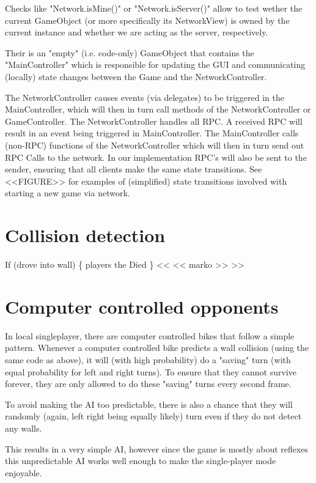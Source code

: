\documentclass{report}
\begin{document}
Checks like "Network.isMine()" or "Network.isServer()" allow to test wether the current GameObject (or more specifically its NetworkView) is owned by the current instance and whether we are acting as the server, respectively. 

Their is an "empty" (i.e. code-only) GameObject that contains the "MainController" which is responsible for updating the GUI and communicating (locally) state changes between the Game and the NetworkController.

The NetworkController causes events (via delegates) to be triggered in the MainController, which will then in turn call methods of the NetworkController or GameController.
The NetworkController handles all RPC. A received RPC will result in an event being triggered in MainController.
The MainController calls (non-RPC) functions of the NetworkController which will then in turn send out RPC Calls  to the network.
In our implementation RPC's will also be sent to the sender, ensuring that all clients make the same state transitions.
See <<FIGURE>> for examples of (simplified) state transitions involved with starting a new game via network.


\section{Collision detection}
If (drove into wall) \{
	players the Died 
	\}
	<< << marko >> >>

\section{Computer controlled opponents}
In local singleplayer, there are computer controlled bikes that follow a simple pattern. 
Whenever a computer controlled bike predicts a wall collision (using the same code as above), it will (with high probability) do a "saving" turn (with equal probability for left and right turns). To ensure that they cannot survive forever, they are only allowed to do these "saving" turns every second frame.

To avoid making the AI too predictable, there is also a chance that they will randomly (again, left right being equally likely) turn even if they do not detect any walls.

This results in a very simple AI, however since the game is mostly about reflexes this unpredictable AI works well enough to make the single-player mode enjoyable.
\end{document}
